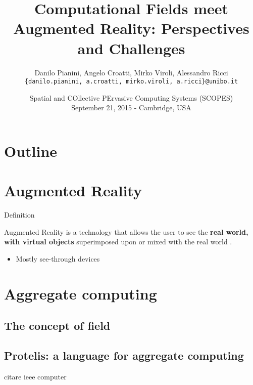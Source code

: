 \documentclass[presentation]{beamer} %
\title[Computational Fields and Augmented Reality]{Computational Fields meet Augmented Reality: Perspectives and Challenges}
\author[Pianini et. al]{
Danilo Pianini, Angelo Croatti, Mirko Viroli, Alessandro Ricci\\
\texttt{{\footnotesize \{danilo.pianini, a.croatti, mirko.viroli, a.ricci\}@unibo.it}}}
\institute[UniBo]
{\textsc{Alma Mater Studiorum}---Universit\`a di Bologna a Cesena}
\date[2015-09-21 SCOPES]{Spatial and COllective PErvasive Computing Systems (SCOPES)\\
\scriptsize September 21, 2015 - Cambridge, USA
}
\begin{document}
\frame[label=coverpage]{\titlepage}

\section*{Outline}
\frame{\tableofcontents}



\section{Augmented Reality}
\begin{frame}{Definition}
  \begin{block}{Augmented Reality}
    is a technology that allows the user to see the \textbf{real world, with virtual objects} superimposed upon or mixed with the real world \cite{Azuma97}.
  \end{block}
  \begin{itemize}
   \item Mostly see-through devices
  \end{itemize}

\end{frame}

\section{Aggregate computing}
\subsection{The concept of field}
\subsection{Protelis: a language for aggregate computing}
citare ieee computer
\end{document}
